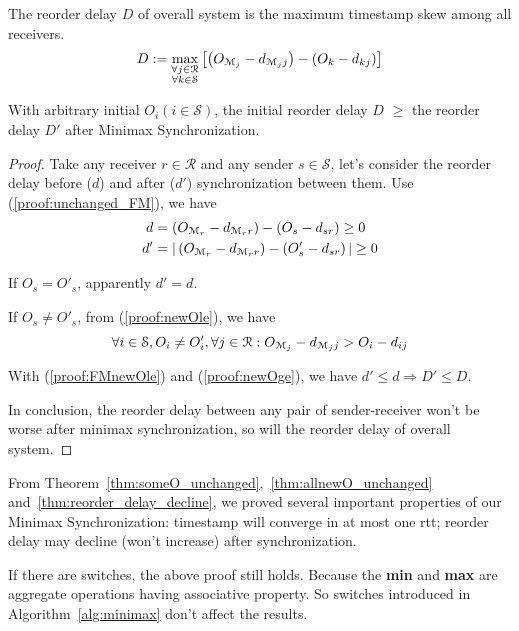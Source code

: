 \begin{definition}
	The reorder delay $D$ of overall system is the maximum timestamp skew among all receivers.
	\begin{equation*}
		D:=\max_{\substack{\forall j \in \mathcal{R}\\\forall k \in \mathcal{S}}}\left[\left({O_{{\mathcal{M}_{j}}}-d_{{{\mathcal{M}_{j}}}{j}}}\right)-\left({O_{k}-d_{{k}{j}}}\right)\right]
	\end{equation*}
\end{definition}
\begin{theorem}\label{thm:reorder_delay_decline}
	With arbitrary initial $O_i(i\in \mathcal{S})$, the initial reorder delay $D$ $\ge$ the reorder delay $D'$ after Minimax Synchronization.
\end{theorem}
\begin{proof}
		Take any receiver $r \in \mathcal{R}$ and any sender $s \in \mathcal{S}$, let's consider the reorder delay before ($d$) and after ($d'$) synchronization between them. Use (\ref{proof:unchanged_FM}), we have
	\begin{equation*}\begin{split}
		 d &=\left({O_{{\mathcal{M}_{r}}}-d_{{{\mathcal{M}_{r}}}{r}}}\right)-\left({O_{s}-d_{{s}{r}}}\right) \ge 0\\ d'&=|\left({O_{{\mathcal{M}_{r}}}-d_{{{\mathcal{M}_{r}}}{r}}}\right)-\left(O'_s - d_{sr}\right)| \ge 0
	\end{split}\end{equation*}
	
	If $O_s = O'_s$, apparently $d'=d$.
	
	If $O_s \neq O'_s$, from (\ref{proof:newOle}), we have
	$$\forall i \in \mathcal{S}, O_i \neq O'_i, \forall j \in \mathcal{R}:{O_{{\mathcal{M}_{j}}}-d_{{{\mathcal{M}_{j}}}{j}}} > {O_{i}-d_{{i}{j}}}$$
	
	With (\ref{proof:FMnewOle}) and (\ref{proof:newOge}), we have $d' \le d \Rightarrow D' \le D$.
	
	In conclusion, the reorder delay between any pair of sender-receiver won't be worse after minimax synchronization, so will the reorder delay of overall system.
\end{proof}
\begin{rem}
	From Theorem~\ref{thm:someO_unchanged},~\ref{thm:allnewO_unchanged} and~\ref{thm:reorder_delay_decline}, we proved several important properties of our Minimax Synchronization:
	timestamp will converge in at most one rtt; reorder delay may decline (won't increase) after synchronization.
\end{rem}
\begin{note}
	If there are switches, the above proof still holds. Because the \textbf{min} and \textbf{max} are aggregate operations having associative property. So switches introduced in Algorithm~\ref{alg:minimax} don't affect the results.
\end{note}

